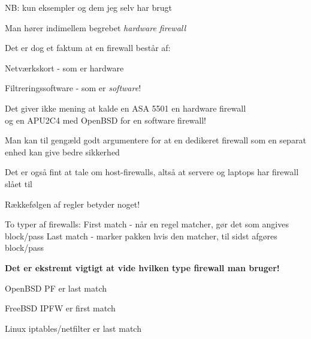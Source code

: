 \documentclass[Screen16to9,17pt]{foils}
\begin{document}
NB: kun eksempler og dem jeg selv har brugt




\begin{list1}
\item Man hører indimellem begrebet \emph{hardware firewall}
\item Det er dog et faktum at en firewall består af:
\begin{list2}
\item Netværkskort - som er hardware
\item Filtreringssoftware - som er \emph{software}!
\end{list2}
\item Det giver ikke mening at kalde en ASA 5501 en hardware firewall\\
  og en APU2C4 med OpenBSD for en software firewall!
\item Man kan til gengæld godt argumentere for at en dedikeret
  firewall som en separat enhed kan give bedre sikkerhed
  \item Det er også fint at tale om host-firewalls, altså at servere og laptops har firewall slået til
\end{list1}








\begin{list1}
\item Rækkefølgen af regler betyder noget!
\begin{list2}
\item To typer af firewalls:
 First match - når en regel matcher, gør det som angives block/pass
 Last match  - marker pakken hvis den matcher, til sidst afgøres block/pass
\end{list2}
\item {\bf Det er ekstremt vigtigt at vide hvilken type firewall
    man bruger!}
\item OpenBSD PF er last match
\item FreeBSD IPFW er first match
\item Linux iptables/netfilter er last match
\end{list1}





\end{document}
